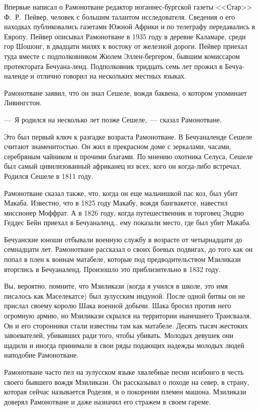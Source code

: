 \documentclass[12pt,a4paper,twoside,openany,svgnames]{memoir}
\begin{document}
Впервые написал о Рамонотване редактор иоганнес-бургской газеты <<Стар>> Ф.~Р.~Пейвер, человек с большим талантом исследователя. Сведения о его находках публиковались газетами Южной Африки и по телеграфу передавались в Европу. Пейвер описывал Рамонотване в 1935 году в деревне Каламаре, среди гор Шошонг, в двадцати милях к востоку от железной дороги. Пейвер приехал туда вместе с подполковником Жюлем Эллен-бергером, бывшим комиссаром протектората Бечуана-ленд. Подполковник тридцать семь лет прожил в Бечуа-наленде и отлично говорил на нескольких местных языках.

Рамонотване заявил, что он знал Сешеле, вождя баквена, о котором упоминает Ливингстон.

---~Я родился на несколько лет позже Сешеле,~--- сказал Рамонотване.

Это был первый ключ к разгадке возраста Рамонотване. В Бечуаналенде Сешеле считают знаменитостью. Он жил в прекрасном доме с зеркалами, часами, серебряным чайником и прочими благами. По мнению охотника Селуса, Сешеле был самый цивилизованный африканец из всех, кого он когда-либо встречал. Родился Сешеле в 1811 году.

Рамонотване сказал также, что, когда он еще мальчишкой пас коз, был убит Макаба. Известно, что в 1825 году Макабу, вождя бангвакетсе, навестил миссионер Моффрат. А в 1826 году, когда путешественник и торговец Эндрю Геддес Бейн приехал в Бечуаналенд,. ему показали место, где был убит Макаба.

Бечуанские юноши отбывали военную службу в возрасте от четырнадцати до семнадцати лет. Рамонотване рассказал о своих боевых подвигах, до того как он попал в плен к воинам матабеле, которые под предводительством Мзиликази вторглись в Бечуаналенд. Произошло это приблизительно в 1832 году.

Вы, вероятно, помните, что Мзиликази (когда я учился в школе, это имя писалось как Маселекатсе) был зулусским индуной. После одной битвы он не прислал своему королю Шака военной добычи. Шака бросил против него огромную армию, но Мзиликази скрылся на территории нынешнего Трансвааля. Он и его сторонники стали известны там как матабеле. Десять тысяч жестоких завоевателей, убивавших ради того, чтобы убивать. Молодых девушек они щадили и иногда принимали в свои ряды подающих надежды молодых людей наподобие Рамонотване.

Рамонотване часто пел на зулусском языке хвалебные песни исибонго в честь своего бывшего вождя Мзиликази. Он рассказывал о походе на север, в страну, которая сейчас называется Родезия, и о покорении племен машона. Мзиликази доверял Рамонотване и даже назначил его стражем в своем гареме.
\end{document}
